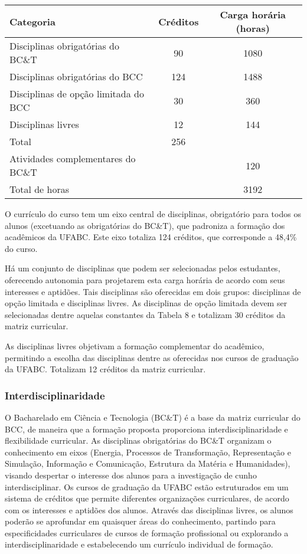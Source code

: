 \begin{center}
	\begin{tabular}{|l|c|c|}
		\hline
		Categoria & Créditos & Carga horária (horas)\\
		\hline\hline
		Disciplinas obrigatórias do BC\&T & 90 & 1080\\
		\hline
		Disciplinas obrigatórias do BCC & 124 & 1488 \\
		\hline
		Disciplinas de opção limitada do BCC & 30 & 360 \\
		\hline
		Disciplinas livres & 12 & 144\\
		\hline
		Total & 256 & \\
		\hline\hline
		Atividades complementares do BC\&T & & 120\\
		\hline
		Total de horas & & 3192\\
		\hline
	\end{tabular}
\end{center}


O currículo do curso tem um eixo central de disciplinas, obrigatório para todos os alunos (excetuando as obrigatórias do BC\&T), que padroniza a formação dos acadêmicos da UFABC. Este eixo totaliza 124 créditos, que corresponde a 48,4\% do curso.

Há um conjunto de disciplinas que podem ser selecionadas pelos estudantes, oferecendo autonomia para projetarem esta carga horária de acordo com seus interesses e aptidões. Tais disciplinas são oferecidas em dois grupos: disciplinas de opção limitada e disciplinas livres. As disciplinas de opção limitada devem ser selecionadas dentre aquelas constantes da Tabela 8 e
totalizam 30 créditos da matriz curricular.

As disciplinas livres objetivam a formação complementar do acadêmico, permitindo a escolha das disciplinas dentre as oferecidas nos cursos de graduação da UFABC. Totalizam 12 créditos da matriz curricular.



\subsubsection{Interdisciplinaridade}
O Bacharelado em Ciência e Tecnologia (BC\&T) é a base da matriz curricular do BCC, de maneira que a formação proposta proporciona interdisciplinaridade e flexibilidade curricular. As disciplinas obrigatórias do BC\&T organizam o conhecimento em eixos (Energia, Processos de Transformação, Representação e Simulação, Informação e Comunicação, Estrutura da Matéria e Humanidades), visando despertar o interesse dos alunos para a investigação de cunho interdisciplinar. Os cursos de graduação da UFABC estão estruturados em um sistema de créditos que permite diferentes organizações curriculares, de acordo com os interesses e aptidões dos alunos. Através das disciplinas livres, os alunos poderão se aprofundar em quaisquer áreas do conhecimento, partindo para especificidades curriculares de cursos de formação profissional ou explorando a interdisciplinaridade e estabelecendo um currículo individual de formação.


